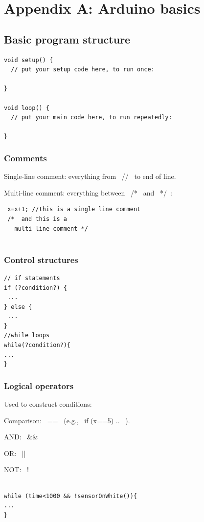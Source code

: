 \documentclass[oneside]{stml-l}
\numberwithin{figure}{chapter}
\begin{document}
\chapter{Appendix A: Arduino basics}\label{c:arduino}
\section{Basic program structure}
\par\noindent
\begin{lstlisting}
void setup() {
  // put your setup code here, to run once:

}

void loop() {
  // put your main code here, to run repeatedly: 
  
}
\end{lstlisting}

\subsection*{Comments}
Single-line comment: everything from ~//~ to end of line.

Multi-line comment: everything between ~/*~ and ~*/~:
\begin{lstlisting}
 x=x+1; //this is a single line comment
 /*  and this is a 
   multi-line comment */
  
\end{lstlisting}

\subsection*{Control structures}
\par\noindent
\begin{lstlisting}
// if statements
if (?condition?) {
 ...
} else {
 ...
}
//while loops
while(?condition?){
...
}
\end{lstlisting}

\subsection*{Logical operators}
Used to construct conditions: 

Comparison: ~==~ (e.g., ~if (x==5) {.. }~). 


AND: ~&&~

OR: ~||~ 

NOT: ~!~ 

\begin{lstlisting}

while (time<1000 && !sensorOnWhite()){
...
}
  
\end{lstlisting}
\end{document}
